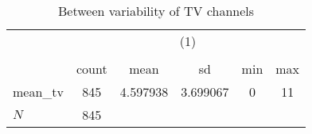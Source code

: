 \begin{table}[htbp]\centering
\def\sym#1{\ifmmode^{#1}\else\(^{#1}\)\fi}
\caption{Between variability of TV channels\label{tab1}}
\begin{tabular}{l*{1}{ccccc}}
\hline\hline
            &\multicolumn{5}{c}{(1)}                                         \\
            &\multicolumn{5}{c}{}                                            \\
            &       count&        mean&          sd&         min&         max\\
\hline
mean\_tv     &         845&    4.597938&    3.699067&           0&          11\\
\hline
\(N\)       &         845&            &            &            &            \\
\hline\hline
\end{tabular}
\end{table}
